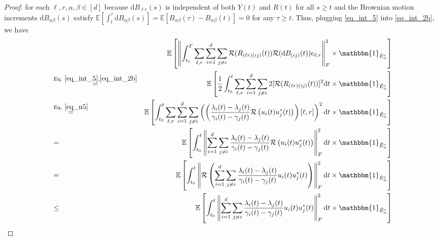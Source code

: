 \documentclass[11pt,letterpaper]{article}
\begin{document}
\begin{proof}
        for each $\ell, r, \alpha, \beta \in [d]$ because $\mathrm{d}B_{\ell r}(s)$ is independent of both $Y(t)$ and $R(t)$ for all $s \geq t$ and the Brownian motion increments $\mathrm{d}B_{\alpha \beta}(s)$ satisfy $\mathbb{E}[\int_t^{\tau} \mathrm{d}B_{\alpha \beta}(s)] = \mathbb{E}[B_{\alpha \beta}(\tau) - B_{\alpha \beta}(t)]= 0$ for any $\tau \geq t$.
        Thus, plugging \eqref{eq_int_5} into \eqref{eq_int_2b}, we have 
   \begin{eqnarray}
        & & \!\!\!\!\!\!\!\! \! \!\!\!\!\!\!\!\!\!\!\!\!\!\!\!\! \! \!\!\!\!\!\!\!\!\!\!\!\!\!\!\!\! \! \!\!\!\!\!\!\!\!\!\!\!\!\!\!\!\mathbb{E}\left [\left\| \int_{t_0}^T\sum_{\ell, r} \sum_{i=1}^{d} \sum_{j \neq i}\mathcal{R}(R_{(\ell r) (i j)}(t))\mathcal{R}(\mathrm{d}B_{(ij)}(t)) e_{\ell, r}\right\|_F^2 \times \mathbbm{1}_{\hat{E}_\alpha^c} \right]  \nonumber\\
   &\stackrel{\textrm{Eq. } \eqref{eq_int_5}, \eqref{eq_int_2b}}{=}& \mathbb{E}\left [\frac{1}{2} \int_{t_0}^t \sum_{\ell, r} \sum_{i=1}^{d} \sum_{j \neq i} 2  [\mathcal{R}(R_{(\ell r) (i j)}(t))]^2 \mathrm{d}t  \times \mathbbm{1}_{\hat{E}_\alpha^c} \right]\nonumber\\
                   &\stackrel{\textrm{Eq. } \eqref{eq_n5}}{=}& 
                   \mathbb{E}\left [ \int_{t_0}^t \sum_{\ell, r} \sum_{i=1}^{d} \sum_{j \neq i}\left(\left( \frac{\lambda_i(t)- \lambda_j(t)}{\gamma_i(t) - \gamma_j(t)} \mathcal{R}\left(u_i(t) u_j^\ast(t)\right)\right)[\ell, r]\right)^2 \mathrm{d}t  \times \mathbbm{1}_{\hat{E}_\alpha^c} \right]\nonumber\\
            &=& \mathbb{E}\left [ \int_{t_0}^t   \left \|\sum_{i=1}^{d} \sum_{j \neq i}\frac{\lambda_i(t)- \lambda_j(t)}{\gamma_i(t) - \gamma_j(t)} \mathcal{R}\left(u_i(t) u_j^\ast(t)\right)\right\|_F^2\mathrm{d}t  \times \mathbbm{1}_{\hat{E}_\alpha^c} \right]\label{eq_n168}\\
            &=& \mathbb{E}\left [ \int_{t_0}^t   \left \|\mathcal{R}\left(\sum_{i=1}^{d} \sum_{j \neq i}\frac{\lambda_i(t)- \lambda_j(t)}{\gamma_i(t) - \gamma_j(t)} u_i(t) u_j^\ast(t)\right)\right\|_F^2\mathrm{d}t  \times \mathbbm{1}_{\hat{E}_\alpha^c} \right]\nonumber\\
            &\leq& \mathbb{E}\left [ \int_{t_0}^t   \left \|\sum_{i=1}^{d} \sum_{j \neq i}\frac{\lambda_i(t)- \lambda_j(t)}{\gamma_i(t) - \gamma_j(t)} u_i(t) u_j^\ast(t)\right\|_F^2\mathrm{d}t  \times \mathbbm{1}_{\hat{E}_\alpha^c} \right] \label{eq_n169}\\

\end{eqnarray}
\end{proof}
\end{document}
